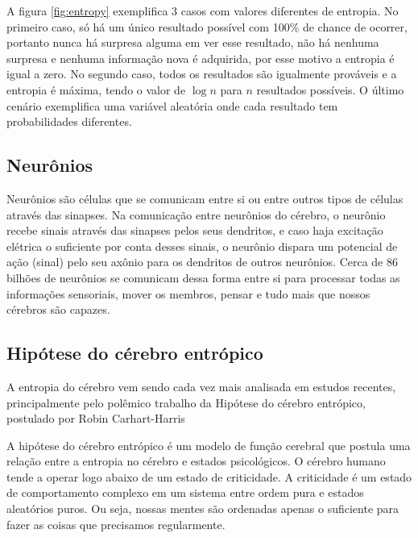 \documentclass[conference]{IEEEtran}
\begin{document}
A figura \ref{fig:entropy} exemplifica 3 casos com valores diferentes de entropia. No primeiro caso, só há um único resultado possível com 100\% de chance de ocorrer, portanto nunca há surpresa alguma em ver esse resultado, não há nenhuma surpresa e nenhuma informação nova é adquirida, por esse motivo a entropia é igual a zero. No segundo caso, todos os resultados são igualmente prováveis e a entropia é máxima, tendo o valor de $\log n$ para $n$ resultados possíveis. O último cenário exemplifica uma variável aleatória onde cada resultado tem probabilidades diferentes.


\subsection{Neurônios}

Neurônios são células que se comunicam entre si ou entre outros tipos de células através das sinapses. Na comunicação entre neurônios do cérebro, o neurônio recebe sinais através das sinapses pelos seus dendritos, e caso haja excitação elétrica o suficiente por conta desses sinais, o neurônio dispara um potencial de ação (sinal) pelo seu axônio para os dendritos de outros neurônios. Cerca de 86 bilhões\cite{houzel} de neurônios se comunicam dessa forma entre si para processar todas as informações sensoriais, mover os membros, pensar e tudo mais que nossos cérebros são capazes. 

\subsection{Hipótese do cérebro entrópico}

A entropia do cérebro vem sendo cada vez mais analisada em estudos recentes\cite{fractal}, principalmente pelo polêmico trabalho da Hipótese do cérebro entrópico\cite{entropic}, postulado por Robin Carhart-Harris

A hipótese do cérebro entrópico é um modelo de função cerebral que postula uma relação entre a entropia no cérebro e estados psicológicos. O cérebro humano tende a operar logo abaixo de um estado de criticidade. A criticidade é um estado de comportamento complexo em um sistema entre ordem pura e estados aleatórios puros. Ou seja, nossas mentes são ordenadas apenas o suficiente para fazer as coisas que precisamos regularmente.
\end{document}
